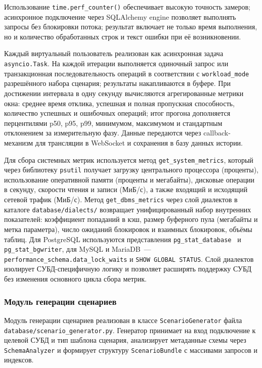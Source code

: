 Использование \texttt{time.perf\_counter()} обеспечивает высокую точность замеров; асинхронное подключение через SQLAlchemy engine позволяет выполнять запросы без блокировки потока; результат включает не только время выполнения, но и количество обработанных строк и текст ошибки при её возникновении.

Каждый виртуальный пользователь реализован как асинхронная задача \texttt{asyncio.Task}. На каждой итерации выполняется одиночный запрос или транзакционная последовательность операций в соответствии с \texttt{workload\_mode} разрешённого набора сценария; результаты накапливаются в буфере. При достижении интервала в одну секунду вычисляются агрегированные метрики окна: среднее время отклика, успешная и полная пропускная способность, количество успешных и ошибочных операций; итог прогона дополняется перцентилями p50, p95, p99, минимумом, максимумом и стандартным отклонением за измерительную фазу. Данные передаются через callback-механизм для трансляции в WebSocket и сохранения в базу данных истории.

Для сбора системных метрик используется метод \texttt{get\_system\_metrics}, который через библиотеку \texttt{psutil} получает загрузку центрального процессора (проценты), использование оперативной памяти (проценты и мегабайты), дисковые операции в секунду, скорости чтения и записи (МиБ/с), а также входящий и исходящий сетевой трафик (МиБ/с). Метод \texttt{get\_dbms\_metrics} через слой диалектов в каталоге \texttt{database/dialects/} возвращает унифицированный набор внутренних показателей: коэффициент попаданий в кэш, размер буферного пула (мегабайты и метка параметра), число ожиданий блокировок и взаимных блокировок, объёмы таблиц. Для PostgreSQL используются представления \texttt{pg\_stat\_database}~\cite{postgresql_docs} и \texttt{pg\_stat\_bgwriter}, для MySQL и MariaDB~--- \texttt{performance\_schema.data\_lock\_waits} и \texttt{SHOW GLOBAL STATUS}. Слой диалектов изолирует СУБД-специфичную логику и позволяет расширять поддержку СУБД без изменения основного цикла сбора метрик.

\subsubsection{Модуль генерации сценариев}

Модуль генерации сценариев реализован в классе \texttt{ScenarioGenerator} файла \texttt{database/scenario\_generator.py}. Генератор принимает на вход подключение к целевой СУБД и тип шаблона сценария, анализирует метаданные схемы через \texttt{SchemaAnalyzer} и формирует структуру \texttt{ScenarioBundle} с массивами запросов и индексов.

